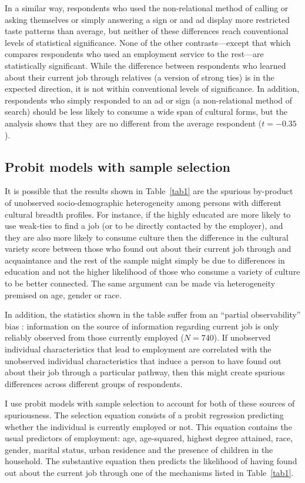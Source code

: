 \documentclass[12pt]{article}
\begin{document}
In a similar way, respondents who used the non-relational method of calling or asking themselves or simply answering a sign or and ad display more restricted taste patterns than average, but neither of these differences reach conventional levels of statistical significance.  None of the other contrasts---except that which compares respondents who used an employment service to the rest---are statistically significant.   While the difference between respondents who learned about their current job through relatives (a version of strong ties) is in the expected direction, it is not within conventional levels of significance.  In addition, respondents who simply responded to an ad or sign (a non-relational method of search) should be less likely to consume a wide span of cultural forms, but the analysis shows that they are no different from the average respondent ($t=-0.35$). 

\subsection{Probit models with sample selection}
It is possible that the results shown in Table~\ref{tab1} are the spurious by-product of unobserved socio-demographic heterogeneity among persons with different cultural breadth profiles.  For instance, if the highly educated are more likely to use weak-ties to find a job (or to be directly contacted by the employer), and they are also more likely to consume culture then the difference in the cultural variety score between those who found out about their current job through and acquaintance and the rest of the sample might simply be due to differences in education and not the higher likelihood of those who consume a variety of culture to be better connected.  The same argument can be made via heterogeneity premised on age, gender or race.  

In addition, the statistics shown in the table suffer from an ``partial observability'' bias \citep{heckman78}:  information on the source of information regarding current job is only reliably observed from those currently employed ($N=740$). If unobserved individual characteristics that lead to employment are correlated with the unobserved individual characteristics that induce a person to have found out about their job through a particular pathway, then this might create spurious differences across different groups of respondents.  

I use probit models with sample selection \citep{heckman78} to account for both of these sources of spuriousness.  The selection equation consists of a probit regression predicting whether the individual is currently employed or not. This equation contains the usual predictors of employment: age, age-squared, highest degree attained, race, gender, marital status, urban residence and the presence of children in the household. The substantive equation then predicts the likelihood of having found out about the current job through one of the mechanisms listed in Table~\ref{tab1}.
\end{document}
